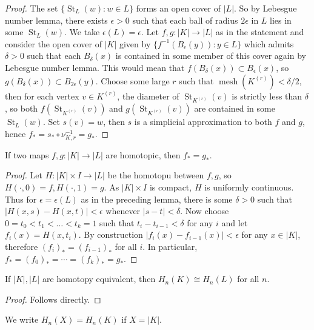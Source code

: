 \begin{proof}
    The set $\{\operatorname{St}_L(w):w\in L\}$ forms an open cover of $|L|$.
    So by Lebesgue number lemma, there exists $\epsilon>0$ such that each ball of radius $2\epsilon$ in $L$ lies in some $\operatorname{St}_L(w)$.
    We take $\epsilon(L)=\epsilon$.
    Let $f,g:|K|\to|L|$ as in the statement and consider the open cover of $|K|$ given by $\{f^{-1}(B_\epsilon(y)):y\in L\}$ which admits $\delta>0$ such that each $B_\delta(x)$ is contained in some member of this cover again by Lebesgue number lemma.
    This would mean that $f(B_\delta(x))\subset B_\epsilon(x)$, so $g(B_\delta(x))\subset B_{2\epsilon}(y)$.
    Choose some large $r$ such that $\operatorname{mesh}(K^{(r)})<\delta/2$, then for each vertex $v\in K^{(r)}$, the diameter of $\operatorname{St}_{K^{(r)}}(v)$ is strictly less than $\delta$, so both $f(\operatorname{St}_{K^{(r)}}(v))$ and $g(\operatorname{St}_{K^{(r)}}(v))$ are contained in some $\operatorname{St}_L(w)$.
    Set $s(v)=w$, then $s$ is a simplicial approximation to both $f$ and $g$, hence $f_\ast=s_\ast\circ \nu_{K,r}^{-1}=g_\ast$.
\end{proof}
\begin{theorem}
    If two maps $f,g:|K|\to|L|$ are homotopic, then $f_\ast=g_\ast$.
\end{theorem}
\begin{proof}
    Let $H:|K|\times I\to |L|$ be the homotopu between $f,g$, so $H(\cdot,0)=f,H(\cdot,1)=g$.
    As $|K|\times I$ is compact, $H$ is uniformly continuous.
    Thus for $\epsilon=\epsilon(L)$ as in the preceding lemma, there is some $\delta>0$ such that $|H(x,s)-H(x,t)|<\epsilon$ whenever $|s-t|<\delta$.
    Now choose $0=t_0<t_1<\ldots<t_k=1$ such that $t_i-t_{i-1}<\delta$ for any $i$ and let $f_i(x)=H(x,t_i)$.
    By construction $|f_i(x)-f_{i-1}(x)|<\epsilon$ for any $x\in |K|$, therefore $(f_i)_\ast=(f_{i-1})_\ast$ for all $i$.
    In particular, $f_\ast=(f_0)_\ast=\cdots=(f_k)_\ast=g_\ast$.
\end{proof}
\begin{corollary}
    If $|K|,|L|$ are homotopy equivalent, then $H_n(K)\cong H_n(L)$ for all $n$.
\end{corollary}
\begin{proof}
    Follows directly.
\end{proof}
\begin{definition}
    We write $H_n(X)=H_n(K)$ if $X=|K|$.
\end{definition}